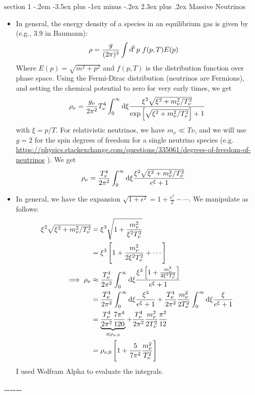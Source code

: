 \documentclass[12pt]{article}
\makeatletter
\newenvironment{problem}{\@startsection
	{section}
	{1}
	{-.2em}
	{-3.5ex plus -1ex minus -.2ex}
	{2.3ex plus .2ex}
	{\pagebreak[3]%
		\large\bf\noindent{Problem }
	}
}
{%
	\begin{center}\large\bf \ldots\ldots\ldots\end{center}}
\newcommand{\rhox}[1]{\ensuremath{\rho_\mathrm{#1} } }
\makeatother
\begin{document}
	\begin{problem}{Massive Neutrinos}

	\begin{itemize}
		\item In general, the energy density of a species in an equilibrium gas is given by (e.g., 3.9 in Baumann): \begin{align*}
			\rho &= \frac{g}{(2\pi)^3} \int\dif^3 p\ f(p,T)E(p)
		\end{align*} Where $E(p) = \sqrt{m^2 + p^2}$ and $f(p,T)$ is the distribution function over phase space.  Using the Fermi-Dirac distribution (neutrinos are Fermions), and setting the chemical potential to zero for very early times, we get \begin{align*}
			\rho_\nu = \frac{g_\nu}{2\pi^2}T_\nu^4 \int_0^\infty \dif\xi \frac{\xi^2\sqrt{\xi^2 + m_\nu^2/T_\nu^2}}{\exp\left[ \sqrt{\xi^2 + m_\nu^2/T_\nu^2 } \right] + 1 }
		\end{align*} with $\xi = p/T$.  For relativistic neutrinos, we have $m_\nu\ll T\nu$, and we will use $g=2$ for the spin degrees of freedom for a single neutrino species (e.g. \url{https://physics.stackexchange.com/questions/335061/degrees-of-freedom-of-neutrinos} ). We get \begin{align*}
			\rho_\nu &= \frac{T_\nu^4}{2\pi^2} \int_0^\infty \dif\xi \frac{\xi^2\sqrt{\xi^2 + m_\nu^2/T_\nu^2}}{e^\xi+ 1 }
		\end{align*}
		
		\item In general, we have the expansion $\sqrt{1 + \epsilon^2} = 1 + \frac{\epsilon^2}{2} - \cdots$.  We manipulate as follows: \begin{align*}
			\xi^2\sqrt{\xi^2 + m_\nu^2/T_\nu^2} &= \xi^3\sqrt{1 + \frac{m_\nu^2}{\xi^2T_\nu^2}}
			\\
			&= \xi^3\left[ 1 + \frac{m_\nu^2}{2\xi^2T_\nu^2} + \cdots \right]
			\\
			\implies \rho_\nu &\approx \frac{T_\nu^4}{2\pi^2} \int_0^\infty \dif\xi \frac{\xi^3\left[ 1 + \frac{m_\nu^2}{2\xi^2T_\nu^2} \right]}{e^\xi+ 1 }
			\\
			&= \frac{T_\nu^4}{2\pi^2} \int_0^\infty \dif\xi \frac{\xi^3}{e^\xi+ 1 } + \frac{T_\nu^4}{2\pi^2} \frac{m_\nu^2}{2T_\nu^2} \int_0^\infty \dif\xi \frac{ \xi }{e^\xi+ 1 }
			\\
			&=  \underbrace{\frac{T_\nu^4}{2\pi^2} \frac{7\pi^4}{120}}_{\equiv \rhox{\nu,0}} + \frac{T_\nu^4}{2\pi^2} \frac{m_\nu^2}{2T_\nu^2} \frac{\pi^2}{12}
			\\
			&=  \rhox{\nu,0} \left[ 1 + \frac{5}{7\pi^2 }\frac{m_\nu^2}{T_\nu^2}\right]
		\end{align*}  I used Wolfram Alpha to evaluate the integrals.
		

\end{itemize}
\end{problem}
\end{document}
